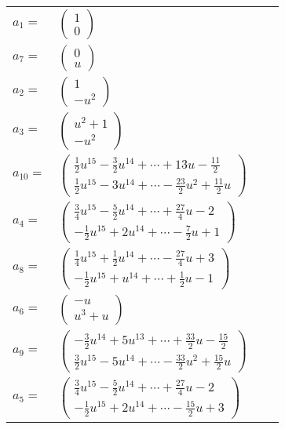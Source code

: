 \documentclass[1p]{elsarticle_modified}
\theoremstyle{definition}
\begin{document}
\begin{tabular}{m{7pt} m{180pt} m{7pt} m{180pt} }
\flushright $a_{1}=$&$\begin{pmatrix}1\\0\end{pmatrix}$ \\
\flushright $a_{7}=$&$\begin{pmatrix}0\\u\end{pmatrix}$ \\
\flushright $a_{2}=$&$\begin{pmatrix}1\\- u^2\end{pmatrix}$ \\
\flushright $a_{3}=$&$\begin{pmatrix}u^2+1\\- u^2\end{pmatrix}$ \\
\flushright $a_{10}=$&$\begin{pmatrix}\frac{1}{2} u^{15}-\frac{3}{2} u^{14}+\cdots+13 u-\frac{11}{2}\\\frac{1}{2} u^{15}-3 u^{14}+\cdots-\frac{23}{2} u^2+\frac{11}{2} u\end{pmatrix}$ \\
\flushright $a_{4}=$&$\begin{pmatrix}\frac{3}{4} u^{15}-\frac{5}{2} u^{14}+\cdots+\frac{27}{4} u-2\\-\frac{1}{2} u^{15}+2 u^{14}+\cdots-\frac{7}{2} u+1\end{pmatrix}$ \\
\flushright $a_{8}=$&$\begin{pmatrix}\frac{1}{4} u^{15}+\frac{1}{2} u^{14}+\cdots-\frac{27}{4} u+3\\-\frac{1}{2} u^{15}+u^{14}+\cdots+\frac{1}{2} u-1\end{pmatrix}$ \\
\flushright $a_{6}=$&$\begin{pmatrix}- u\\u^3+u\end{pmatrix}$ \\
\flushright $a_{9}=$&$\begin{pmatrix}-\frac{3}{2} u^{14}+5 u^{13}+\cdots+\frac{33}{2} u-\frac{15}{2}\\\frac{3}{2} u^{15}-5 u^{14}+\cdots-\frac{33}{2} u^2+\frac{15}{2} u\end{pmatrix}$ \\
\flushright $a_{5}=$&$\begin{pmatrix}\frac{3}{4} u^{15}-\frac{5}{2} u^{14}+\cdots+\frac{27}{4} u-2\\-\frac{1}{2} u^{15}+2 u^{14}+\cdots-\frac{15}{2} u+3\end{pmatrix}$ \\

\end{tabular}
\end{document}
